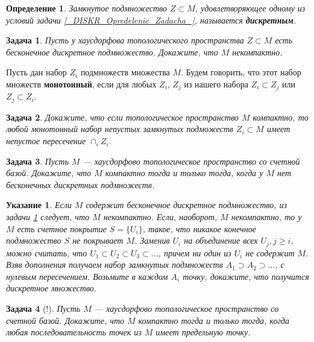 \documentclass[12pt]{book}
\theoremstyle{upshape}
\newtheorem{zadacha}{Задача}[chapter]
\theoremstyle{generic}
\newtheorem{opredelenie}[teorema]{Определение}
\theoremstyle{upshapenonumber}
\newtheorem{ukazanie}{Указание}[section]
\newcommand{\следствие}{%
     \refstepcounter{teorema}
     {\noindent\bf Следствие \thechapter.\arabic{teorema}:\ }}
\newcommand{\пример}{%
     \refstepcounter{teorema}
     {\noindent\bf Пример \thechapter.\arabic{teorema}:\ }}
\newcommand{\лемма}{%
     \refstepcounter{teorema}
     {\noindent\bf Лемма \thechapter.\arabic{teorema}:\ }}
\newcommand{\теорема}{%
     \refstepcounter{teorema}
     {\noindent\bf Теорема \thechapter.\arabic{teorema}:\ }}
\newcommand{\утверждение}{%
     \refstepcounter{teorema}
     {\noindent\bf Утверждение \thechapter.\arabic{teorema}:\ }}
\begin{document}
{\begin{opredelenie}
Замкнутое подмножество $Z\subset M$, удовлетворяющее одному из условий
задачи \ref{_DISKR_Opredelenie_Zadacha_}, называется {\bf
дискретным}.
\end{opredelenie}

\begin{zadacha}
\label{_discre_nekompa_Zadacha_}
Пусть у хаусдорфова топологического пространства $Z\subset
  M$ есть бесконечное дискретное подмножество. Докажите, что
$M$ некомпактно.
\end{zadacha}

Пусть дан набор $Z_i$ подмножеств множества $M$. Будем говорить, что
этот набор множеств {\bf монотонный},
если для любых $Z_i$, $Z_j$ из нашего набора $Z_i \subset Z_j$ или
$Z_j \subset Z_i$.

\begin{zadacha}\label{cap.1}
Докажите, что если топологическое пространство $M$ компактно, то 
любой монотонный набор непустых замкнутых
подможеств $Z_i \subset M$ имеет непустое пересечение $\cap_i Z_i$.
\end{zadacha}



\begin{zadacha}\label{diskr}
Пусть $M$ --- хаусдорфово топологическое пространство
со счетной базой.
Докажите, что $M$ компактно тогда и только тогда,
когда у $M$ нет бесконечных дискретных подмножеств.
\end{zadacha}


\begin{ukazanie}
Если $M$ содержит бесконечное
дискретное подмножество, из задачи \ref{_discre_nekompa_Zadacha_}
следует, что $M$ некомпактно. Если, наоборот,
$M$ некомпактно, то у $M$ есть счетное покрытие
$S= \{U_i\}$, такое, что никакое конечное подмножество
$S$ не покрывает $M$. Заменив $U_i$ на объединение
всех $U_j, j\geq i$, можно считать, что
$U_1 \subset U_2\subset U_3 \subset ...$, причем
ни один из $U_i$ не содержит $M$. Взяв дополнения
получаем набор замкнутых подмножеств
$A_1\supset A_2\supset ...$, с нулевым
пересечением. Возьмите в каждом $A_i$
точку, докажите, что получится 
дискретное множество.
\end{ukazanie}


\begin{zadacha}[!]
Пусть $M$ --- хаусдорфово топологическое пространство со счетной
базой. Докажите, что $M$ компактно тогда и только тогда,
когда любая последовательность точек из $M$
имеет предельную точку.
\end{zadacha}

}
\end{document}
